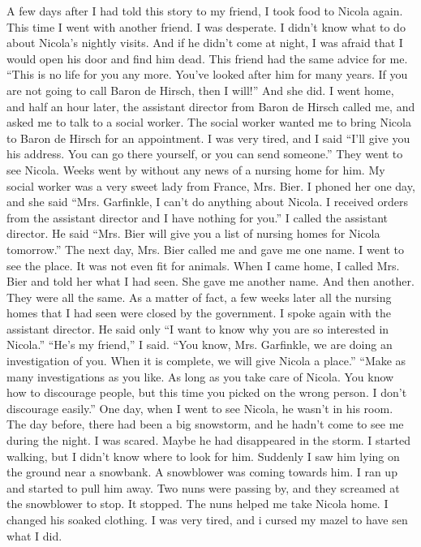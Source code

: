 A few days after I had told this story to my friend, I took food to Nicola again. This time I went with another friend. I was desperate. I didn’t know what to do about Nicola’s nightly visits. And if he didn’t come at night, I was afraid that I would open his door and find him dead.
This friend had the same advice for me. “This is no life for you any more. You’ve looked after him for many years. If you are not going to call Baron de Hirsch, then I will!” And she did. I went home, and half an hour later, the assistant director from Baron de Hirsch called me, and asked me to talk to a social worker. The social worker wanted me to bring Nicola to Baron de Hirsch for an appointment. I was very tired, and I said “I’ll give you his address. You can go there yourself, or you can send someone.”
They went to see Nicola. Weeks went by without any news of a nursing home for him. My social worker was a very sweet lady from France, Mrs. Bier. I phoned her one day, and she said “Mrs. Garfinkle, I can’t do anything about Nicola. I received orders from the assistant director and I have nothing for you.”
I called the assistant director. He said “Mrs. Bier will give you a list of nursing homes for Nicola tomorrow.” The next day, Mrs. Bier called me and gave me one name. I went to see the place. It was not even fit for animals. When I came home, I called Mrs. Bier and told her what I had seen. She gave me another name. And then another. They were all the same. As a matter of fact, a few weeks later all the nursing homes that I had seen were closed by the government.
I spoke again with the assistant director. He said only “I want to know why you are so interested in Nicola.”
“He’s my friend,” I said.
“You know, Mrs. Garfinkle, we are doing an investigation of you. When it is complete, we will give Nicola a place.”
“Make as many investigations as you like. As long as you take care of Nicola. You know how to discourage people, but this time you picked on the wrong person. I don’t discourage easily.”
One day, when I went to see Nicola, he wasn’t in his room. The day before, there had been a big snowstorm, and he hadn’t come to see me during the night. I was scared. Maybe he had disappeared in the storm. I started walking, but I didn’t know where to look for him. Suddenly I saw him lying on the ground near a snowbank. A snowblower was coming towards him. I ran up and started to pull him away. Two nuns were passing by, and they screamed at the snowblower to stop. It stopped. The nuns helped me take Nicola home. I changed his soaked clothing. I was very tired, and i cursed my mazel to have sen what I did.

